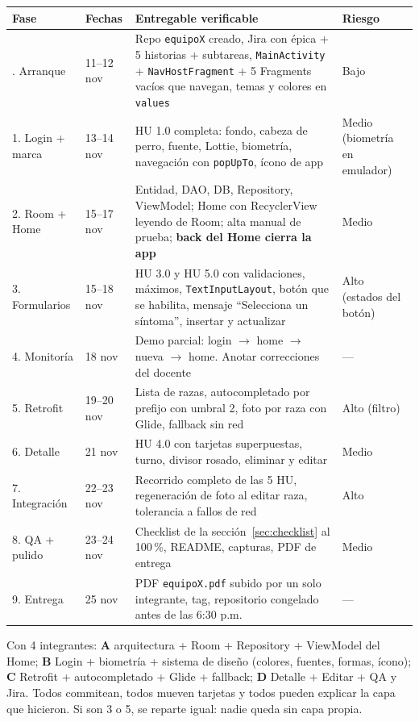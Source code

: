 \documentclass[11pt,letterpaper]{article}
\newcommand{\code}[1]{\texttt{\small #1}}
\begin{document}
\begin{center}
\small
\begin{xltabular}{\linewidth}{@{}l l X l@{}}
\toprule
\textbf{Fase} & \textbf{Fechas} & \textbf{Entregable verificable} & \textbf{Riesgo}\\
\midrule
\endhead
\bottomrule
{}. Arranque & 11--12 nov & Repo \code{equipoX} creado, Jira con \'epica + 5 historias + subtareas, \code{MainActivity} + \code{NavHostFragment} + 5 Fragments vac\'ios que navegan, temas y colores en \code{values} & Bajo\\
1. Login + marca & 13--14 nov & HU 1.0 completa: fondo, cabeza de perro, fuente, Lottie, biometr\'ia, navegaci\'on con \code{popUpTo}, \'icono de app & Medio (biometr\'ia en emulador)\\
2. Room + Home & 15--17 nov & Entidad, DAO, DB, Repository, ViewModel; Home con RecyclerView leyendo de Room; alta manual de prueba; \textbf{back del Home cierra la app} & Medio\\
3. Formularios & 15--18 nov & HU 3.0 y HU 5.0 con validaciones, m\'aximos, \code{TextInputLayout}, bot\'on que se habilita, mensaje ``Selecciona un s\'intoma'', insertar y actualizar & Alto (estados del bot\'on)\\
4. Monitor\'ia & 18 nov & Demo parcial: login $\to$ home $\to$ nueva $\to$ home. Anotar correcciones del docente & ---\\
5. Retrofit & 19--20 nov & Lista de razas, autocompletado por prefijo con umbral 2, foto por raza con Glide, fallback sin red & Alto (filtro)\\
6. Detalle & 21 nov & HU 4.0 con tarjetas superpuestas, turno, divisor rosado, eliminar y editar & Medio\\
7. Integraci\'on & 22--23 nov & Recorrido completo de las 5 HU, regeneraci\'on de foto al editar raza, tolerancia a fallos de red & Alto\\
8. QA + pulido & 23--24 nov & Checklist de la secci\'on~\ref{sec:checklist} al 100\,\%, README, capturas, PDF de entrega & Medio\\
9. Entrega & 25 nov & PDF \code{equipoX.\allowbreak{}pdf} subido por un solo integrante, tag, repositorio congelado antes de las 6:30 p.m. & ---\\
\end{xltabular}
\end{center}

\begin{techbox}
Con 4 integrantes: \textbf{A} arquitectura + Room + Repository + ViewModel del
Home; \textbf{B} Login + biometr\'ia + sistema de dise\~no (colores, fuentes,
formas, \'icono); \textbf{C} Retrofit + autocompletado + Glide + fallback;
\textbf{D} Detalle + Editar + QA y Jira. Todos commitean, todos mueven tarjetas y
todos pueden explicar la capa que hicieron. Si son 3 o 5, se reparte igual: nadie
queda sin capa propia.
\end{techbox}
\end{document}
